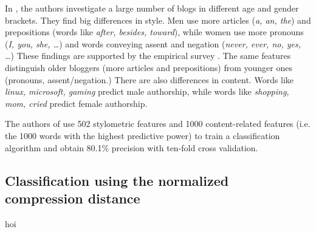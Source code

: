 In \cite{Schler2005}, the authors investigate a large number of blogs in
different age and gender brackets. They find big differences in style. Men
use more articles (\emph{a, an, the}) and prepositions (words like
\emph{after, besides, toward}), while women use more pronouns (\emph{I,
you, she, \dots}) and words conveying assent and negation (\emph{never,
ever, no, yes, \dots}) These findings are supported by the empirical
survey \cite{Mulac2001}. The same features distinguish older bloggers
(more articles and prepositions) from younger ones (pronouns,
assent/negation.) There are also differences in content. Words like
\emph{linux, microsoft, gaming} predict male authorship, while words like
\emph{shopping, mom, cried} predict female authorship.

The authors of \cite{Schler2005} use 502 stylometric features and 1000
content-related features (i.e. the 1000 words with the highest predictive
power) to train a classification algorithm and obtain 80.1\% precision
with ten-fold cross validation.

\subsection{Classification using the normalized compression distance}

hoi

